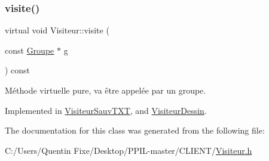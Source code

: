 \subsubsection{\texorpdfstring{visite()}{visite()}\hspace{0.1cm}{\footnotesize\ttfamily [5/5]}}
{\footnotesize\ttfamily virtual void Visiteur\+::visite (\begin{DoxyParamCaption}\item[{const \hyperlink{class_groupe}{Groupe} $\ast$}]{g }\end{DoxyParamCaption}) const\hspace{0.3cm}{\ttfamily [pure virtual]}}



Méthode virtuelle pure, va être appelée par un groupe. 



Implemented in \hyperlink{class_visiteur_sauv_t_x_t_ae8812148d83e565dc96302df7cc92049}{Visiteur\+Sauv\+T\+XT}, and \hyperlink{class_visiteur_dessin_a295e7bd446e4650257d0cb8c4d8c9ec5}{Visiteur\+Dessin}.



The documentation for this class was generated from the following file\+:\begin{DoxyCompactItemize}
\item 
C\+:/\+Users/\+Quentin Fixe/\+Desktop/\+P\+P\+I\+L-\/master/\+C\+L\+I\+E\+N\+T/\hyperlink{_visiteur_8h}{Visiteur.\+h}\end{DoxyCompactItemize}
